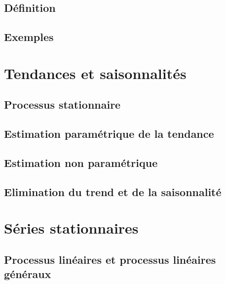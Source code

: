 \documentclass[
]{book}
\theoremstyle{definition}
\theoremstyle{definition}
\theoremstyle{definition}
\theoremstyle{definition}
\theoremstyle{remark}
\begin{document}
\hypertarget{duxe9finition-5}{%
\section{Définition}\label{duxe9finition-5}}

\hypertarget{exemples}{%
\section{Exemples}\label{exemples}}

\hypertarget{tendances-et-saisonnalituxe9s}{%
\chapter{Tendances et saisonnalités}\label{tendances-et-saisonnalituxe9s}}

\hypertarget{processus-stationnaire}{%
\section{Processus stationnaire}\label{processus-stationnaire}}

\hypertarget{estimation-paramuxe9trique-de-la-tendance}{%
\section{Estimation paramétrique de la tendance}\label{estimation-paramuxe9trique-de-la-tendance}}

\hypertarget{estimation-non-paramuxe9trique}{%
\section{Estimation non paramétrique}\label{estimation-non-paramuxe9trique}}

\hypertarget{elimination-du-trend-et-de-la-saisonnalituxe9}{%
\section{Elimination du trend et de la saisonnalité}\label{elimination-du-trend-et-de-la-saisonnalituxe9}}

\hypertarget{series-stat}{%
\chapter{Séries stationnaires}\label{series-stat}}

\hypertarget{processus-linuxe9aires-et-processus-linuxe9aires-guxe9nuxe9raux}{%
\section{Processus linéaires et processus linéaires généraux}\label{processus-linuxe9aires-et-processus-linuxe9aires-guxe9nuxe9raux}}
\end{document}
